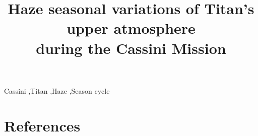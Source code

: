 \documentclass[review, authoryear, hidelinks]{elsarticle}
\begin{document}
\begin{frontmatter}
    \title{Haze seasonal variations of Titan's upper atmosphere\\during the Cassini Mission}

    

    \begin{abstract}
        
    \end{abstract}

    \begin{keyword}
    Cassini \sep Titan \sep Haze \sep Season cycle
    \end{keyword}
\end{frontmatter}

\begin{linenumbers}

    
    
    
    
    
    
    

\end{linenumbers}

\section*{References}

\end{document}
